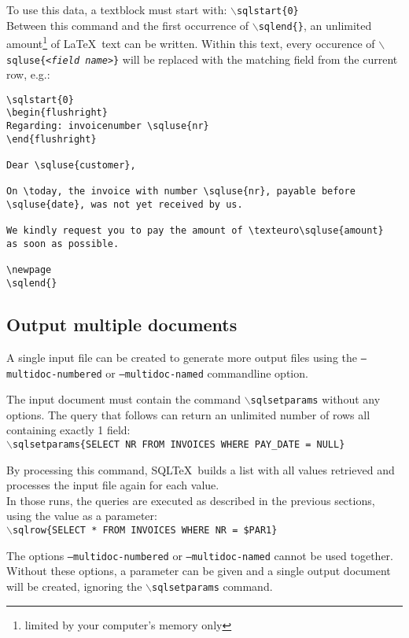 \documentclass{article}
\newcommand{\bs}{\ensuremath{\backslash}}
\newcommand{\vs}{\vspace{3mm}}
\begin{document}
To use this data, a textblock must start with: \texttt{\bs sqlstart\{0\}}\\
Between this command and the first occurrence of \texttt{\bs sqlend\{\}}, an unlimited amount\footnote{ limited by your computer's memory only} of \LaTeX\ text can be written. Within this text, every occurence of \texttt{\bs sqluse\{<\textit{field name}>\}} will be replaced with the matching field from the current row, e.g.:

\noindent\begin{verbatim}
\sqlstart{0}
\begin{flushright}
Regarding: invoicenumber \sqluse{nr}
\end{flushright}

Dear \sqluse{customer},

On \today, the invoice with number \sqluse{nr}, payable before
\sqluse{date}, was not yet received by us.

We kindly request you to pay the amount of \texteuro\sqluse{amount}
as soon as possible.

\newpage
\sqlend{}
\end{verbatim}


\subsection{Output multiple documents}\label{multidoc}

A single input file can be created to generate more output files using the \texttt{--multidoc-numbered} or \texttt{--multidoc-named} commandline option.

The input document must contain the command \texttt{\bs sqlsetparams} without any options. The query that follows can return an unlimited number of rows all containing exactly 1 field: \\
\texttt{\bs sqlsetparams\{SELECT NR FROM INVOICES WHERE PAY\_DATE = NULL\}}

\vs

By processing this command, SQL\TeX\ builds a list with all values retrieved and
processes the input file again for each value.\\
In those runs, the queries are executed as described in the previous sections,
using the value as a parameter:\\
\texttt{\bs sqlrow\{SELECT * FROM INVOICES WHERE NR = \$PAR1\}}

\vs

The options \texttt{--multidoc-numbered} or \texttt{--multidoc-named} cannot be used together.\\
Without these options, a parameter can be given and a single output
document will be created, ignoring the \texttt{\bs sqlsetparams} command.
\end{document}
